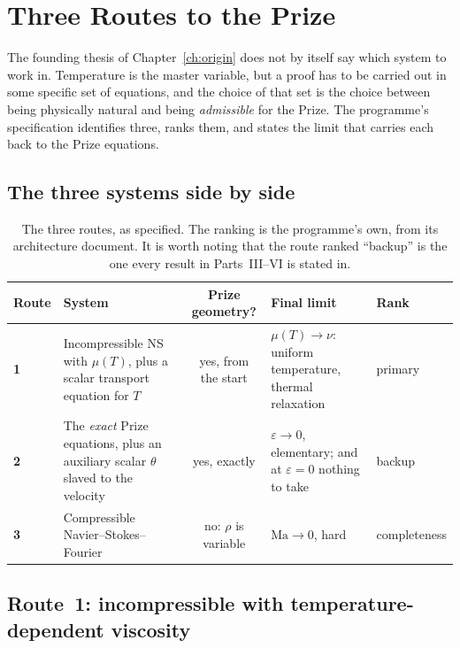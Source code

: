\chapter{Three Routes to the Prize}
\label{ch:routes}

The founding thesis of Chapter~\ref{ch:origin} does not by itself say which
system to work in. Temperature is the master variable, but a proof has to be
carried out in some specific set of equations, and the choice of that set is
the choice between being physically natural and being \emph{admissible} for
the Prize. The programme's specification identifies three, ranks them, and
states the limit that carries each back to the Prize equations.

\section{The three systems side by side}
\label{sec:three-systems}

\begin{table}[ht]
\centering
\small
\begin{tabular}{@{}l p{} c p{} p{}@{}}
\toprule
Route & System & Prize geometry? & Final limit & Rank \\
\midrule
\textbf{1} & Incompressible NS with \(\mu(T)\), plus a scalar transport
  equation for \(T\)
  & yes, from the start
  & \(\mu(T)\to\nu\): uniform temperature, thermal relaxation
  & primary \\[4pt]
\textbf{2} & The \emph{exact} Prize equations, plus an auxiliary scalar
  \(\theta\) slaved to the velocity
  & yes, exactly
  & \(\varepsilon\to0\), elementary; and at \(\varepsilon=0\) nothing to take
  & backup \\[4pt]
\textbf{3} & Compressible Navier--Stokes--Fourier
  & no: \(\rho\) is variable
  & \(\mathrm{Ma}\to0\), hard
  & completeness \\
\bottomrule
\end{tabular}
\caption[The three routes]{The three routes, as specified. The ranking is the
programme's own, from its architecture document. It is worth noting that the
route ranked ``backup'' is the one every result in Parts~III--VI is stated
in.}
\label{tab:three-routes}
\end{table}

\section{Route~1: incompressible with temperature-dependent viscosity}
\label{sec:route1}

